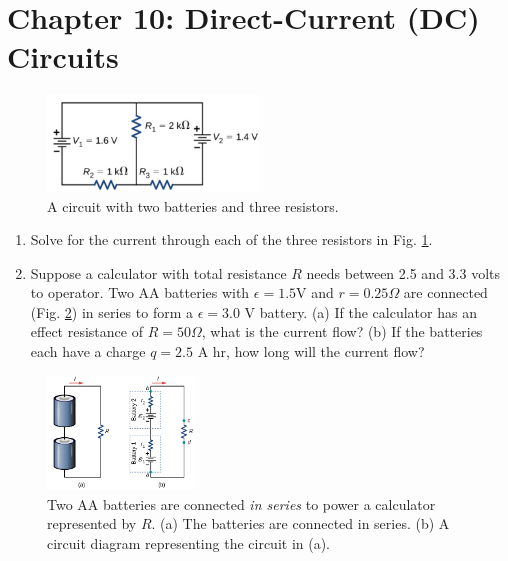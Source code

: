 \documentclass[10pt]{article}
\begin{document}
\clearpage

\section{Chapter 10: Direct-Current (DC) Circuits}

\begin{figure}[ht]
\centering
\includegraphics[width=0.5\textwidth]{circuit1.png}
\caption{\label{fig:circuit1} A circuit with two batteries and three resistors.}
\end{figure}

\begin{enumerate}
\item Solve for the current through each of the three resistors in Fig. \ref{fig:circuit1}. \\ \vspace{4cm}
\item Suppose a calculator with total resistance $R$ needs between 2.5 and 3.3 volts to operator.  Two AA batteries with $\epsilon = 1.5$V and $r = 0.25\Omega$ are connected (Fig. \ref{fig:ohm2}) in series to form a $\epsilon = 3.0$ V battery.  (a) If the calculator has an effect resistance of $R = 50\Omega$, what is the current flow? (b) If the batteries each have a charge $q = 2.5$ A hr, how long will the current flow? \\ \vspace{3cm}
\end{enumerate}

\begin{figure}[hb]
\centering
\includegraphics[width=0.35\textwidth]{ohm2.png}
\caption{\label{fig:ohm2} Two AA batteries are connected \textit{in series} to power a calculator represented by $R$.  (a) The batteries are connected in series.  (b) A circuit diagram representing the circuit in (a).}
\end{figure}
\end{document}
